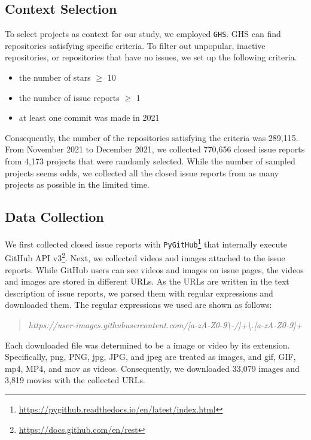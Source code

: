 \subsection{Context Selection}
\label{sec:design:context}
To select projects as context for our study, we employed \texttt{GHS}\citep{msr2021data}. GHS can find repositories satisfying specific criteria. To filter out unpopular, inactive repositories, or repositories that have no issues, we set up the following criteria.
\begin{itemize}
	\item the number of stars $\geq$ 10
	\item the number of issue reports $\geq$ 1
	\item at least one commit was made in 2021
\end{itemize}
Consequently, the number of the repositories satisfying the criteria was 289,115. From November 2021 to December 2021, we collected 770,656 closed issue reports from 4,173 projects that were randomly selected. While the number of sampled projects seems odds, we collected all the closed issue reports from as many projects as possible in the limited time.  


% 

\subsection{Data Collection}
We first collected closed issue reports with \texttt{PyGitHub}\footnote{\url{https://pygithub.readthedocs.io/en/latest/index.html}} that internally execute GitHub API v3\footnote{\url{https://docs.github.com/en/rest}}. 
Next, we collected videos and images attached to the issue reports. While GitHub users can see videos and images on issue pages, the videos and images are stored in different URLs. As the URLs are written in the text description of issue reports, we parsed them with regular expressions and downloaded them. The regular expressions we used are shown as follows:
\begin{quote}
\addtolength\leftmargini{0in}
{\it https://user-images.githubusercontent.com/[a-zA-Z0-9\textbackslash-/]+\textbackslash.[a-zA-Z0-9]+}
\end{quote}
Each downloaded file was determined to be a image or video by its extension. Specifically, png, PNG, jpg, JPG, and jpeg are treated as images, and  gif, GIF, mp4, MP4, and mov as videos.
Consequently, we downloaded 33,079 images and 3,819 movies
with the collected URLs. 


